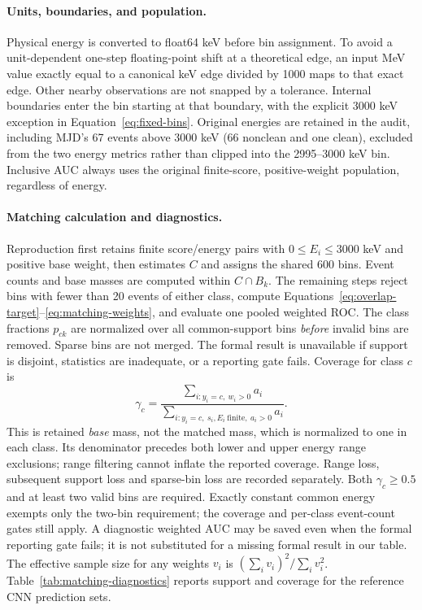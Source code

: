 \paragraph{Units, boundaries, and population.}
Physical energy is converted to float64 keV before bin assignment. To avoid
a unit-dependent one-step floating-point shift at a theoretical edge,
an input MeV value exactly equal to a canonical keV edge divided by 1000
maps to that exact edge. Other nearby observations are not snapped by a
tolerance. Internal boundaries enter the bin starting at that boundary,
with the explicit 3000 keV exception in Equation~\ref{eq:fixed-bins}.
Original energies are retained in the audit, including MJD's 67 events above
3000 keV (66 nonclean and one clean), excluded from the two energy metrics
rather than clipped into the 2995--3000 keV bin. Inclusive AUC always uses the original finite-score,
positive-weight population, regardless of energy.

\paragraph{Matching calculation and diagnostics.}
Reproduction first retains finite score/energy pairs with
$0\leq E_i\leq3000$ keV and positive base weight, then estimates $C$ and
assigns the shared 600 bins. Event counts and base masses are computed within
$C\cap B_k$. The remaining steps reject bins with fewer than 20 events of
either class, compute
Equations~\ref{eq:overlap-target}--\ref{eq:matching-weights}, and evaluate
one pooled weighted ROC. The class fractions $p_{ck}$ are normalized over
all common-support bins \emph{before} invalid bins are removed. Sparse bins
are not merged. The formal result is unavailable if support is disjoint,
statistics are inadequate, or a reporting gate fails. Coverage for class $c$
is
\begin{equation}
 \gamma_c=\frac{\sum_{i:y_i=c,\ w_i>0}a_i}
 {\sum_{i:y_i=c,\ s_i,E_i\ \mathrm{finite},\ a_i>0}a_i}.
\end{equation}
This is retained \emph{base} mass, not the matched mass, which is normalized
to one in each class. Its denominator precedes both lower and upper energy
range exclusions; range filtering cannot inflate the reported coverage.
Range loss, subsequent support loss and sparse-bin loss are recorded
separately. Both $\gamma_c\geq0.5$ and at least two valid bins are
required. Exactly constant common energy exempts only the two-bin requirement;
the coverage and per-class event-count gates still apply. A diagnostic weighted
AUC may be saved even when the formal reporting gate fails; it is not
substituted for a missing formal result in our table.
The effective sample size for any weights $v_i$ is
$(\sum_i v_i)^2/\sum_i v_i^2$.
Table~\ref{tab:matching-diagnostics} reports support and coverage for the
reference CNN prediction sets.

